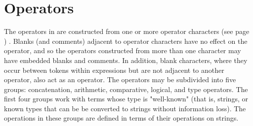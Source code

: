 \section{Operators}\label{refops}
 The operators in \nr{} are constructed from one or more
 operator characters (see page \pageref{refopers}) .
Blanks (and comments) adjacent to operator characters have no effect on
the operator, and so the operators constructed from more than one
character may have embedded blanks and comments.
In addition, blank characters, where they occur between tokens within
expressions but are not adjacent to another operator, also act as an
operator.
 The operators may be subdivided into five groups: concatenation,
arithmetic, comparative, logical, and type operators.  The first four
groups work with terms whose type is "well-known" (that is,
strings, or known types that can be be converted to strings without
information loss).  The operations in these groups are defined in terms
of their operations on strings.
